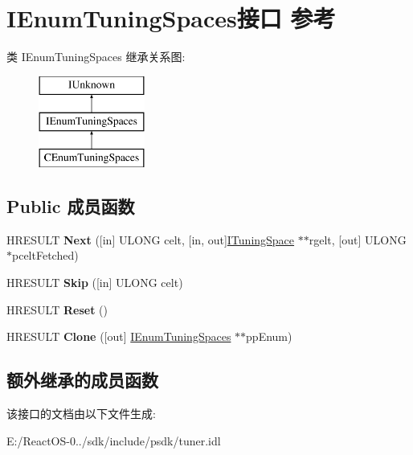 \hypertarget{interface_i_enum_tuning_spaces}{}\section{I\+Enum\+Tuning\+Spaces接口 参考}
\label{interface_i_enum_tuning_spaces}
类 I\+Enum\+Tuning\+Spaces 继承关系图\+:\begin{figure}[H]
\begin{center}
\leavevmode
\includegraphics[height=3.000000cm]{interface_i_enum_tuning_spaces}
\end{center}
\end{figure}
\subsection*{Public 成员函数}
\begin{DoxyCompactItemize}
\item 
\mbox{\label{interface_i_enum_tuning_spaces_a928f3824eae6519098a8617b3e61f62f}} 
H\+R\+E\+S\+U\+LT {\bfseries Next} (\mbox{[}in\mbox{]} U\+L\+O\+NG celt, \mbox{[}in, out\mbox{]}\hyperlink{interface_i_tuning_space}{I\+Tuning\+Space} $\ast$$\ast$rgelt, \mbox{[}out\mbox{]} U\+L\+O\+NG $\ast$pcelt\+Fetched)
\item 
\mbox{\label{interface_i_enum_tuning_spaces_acb9275d165e5a3c889f3926972112184}} 
H\+R\+E\+S\+U\+LT {\bfseries Skip} (\mbox{[}in\mbox{]} U\+L\+O\+NG celt)
\item 
\mbox{\label{interface_i_enum_tuning_spaces_aad3d4c631f11e47b6182ce1f24672d82}} 
H\+R\+E\+S\+U\+LT {\bfseries Reset} ()
\item 
\mbox{\label{interface_i_enum_tuning_spaces_a416a96872ead0e10e933a093287038ac}} 
H\+R\+E\+S\+U\+LT {\bfseries Clone} (\mbox{[}out\mbox{]} \hyperlink{interface_i_enum_tuning_spaces}{I\+Enum\+Tuning\+Spaces} $\ast$$\ast$pp\+Enum)
\end{DoxyCompactItemize}
\subsection*{额外继承的成员函数}


该接口的文档由以下文件生成\+:\begin{DoxyCompactItemize}
\item 
E\+:/\+React\+O\+S-\/0../sdk/include/psdk/tuner.\+idl\end{DoxyCompactItemize}
